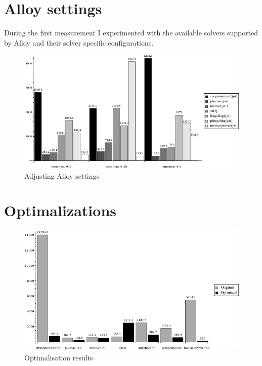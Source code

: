 \section{Alloy settings}
\label{sec:alloysettings}

During the first measurement I experimented with the available solvers supported by Alloy and their solver specific configurations. 

\begin{figure}[htp]
\centering
\includegraphics[scale=0.5]{figures/measurements_alloy_settings}
\caption{Adjusting Alloy settings}
\label{fig:measurements_alloy_settings}
\end{figure}


\section{Optimalizations}
\label{sec:optimalizations}

\begin{figure}[htp]
\centering
\includegraphics[scale=0.5]{figures/measurements_optimalizations}
\caption{Optimalisation results}
\label{fig:measurements_optimalizations}
\end{figure}


